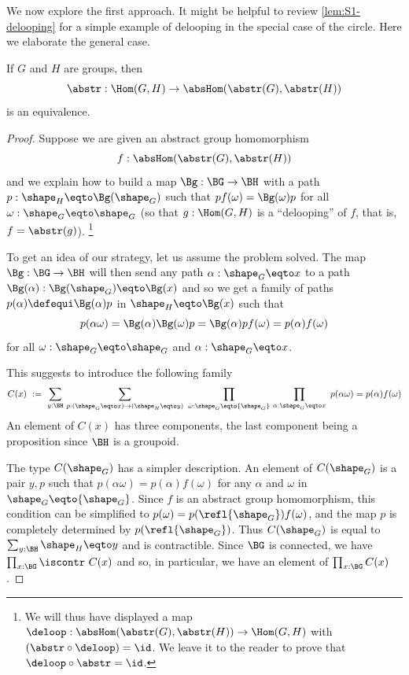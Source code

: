 \label{sec:delooping} %
We now explore the first approach.
It might be helpful to review \cref{lem:S1-delooping}
for a simple example of delooping in the special case of the circle.
Here we elaborate the general case.

\begin{lemma}
  \label{lem:homomabstrconcr}
  If $G$ and $H$ are groups, then
$$\abstr:\Hom(G,H)\to\absHom(\abstr(G),\abstr(H))$$
is an equivalence.
\end{lemma}

\begin{proof}
  Suppose we are given an abstract group homomorphism
$$f:\absHom(\abstr(G),\abstr(H))$$
and we explain how to build a map $\Bg:\BG \rightarrow \BH$ with
a path $p:\sh_H \eqto \Bg(\sh_G)$ such that $p f(\omega) = \Bg(\omega) p$
for all $\omega:\sh_G \eqto \sh_G$ (so that $g:\Hom(G,H)$ is a ``delooping'' of $f$, 
that is, $f=\abstr(g)$).%
\footnote{We will thus have displayed a map
$\deloop:\absHom(\abstr(G),\abstr(H))\to\Hom(G,H)$ with 
$({\abstr}\circ\deloop)=\id$. We leave it to the reader 
to prove that $\deloop\circ{\abstr}=\id$. }

To get an idea of our strategy, let us assume the problem solved. The map $\Bg:\BG\rightarrow \BH$
will then send any path $\alpha:\sh_G \eqto x$ to a path $\Bg(\alpha):\Bg(\sh_G) \eqto \Bg(x)$
and so we get a family of paths $p(\alpha) \defequi \Bg(\alpha) p$ in ${\sh_H} \eqto \Bg(x)$ such that
$$p(\alpha\omega) = \Bg(\alpha)\Bg(\omega)p
  = \Bg(\alpha)pf(\omega) = p(\alpha)f(\omega)$$
for all $\omega:\sh_G \eqto \sh_G$ and $\alpha : \sh_G \eqto x$.

This suggests to introduce the following family
$$
C(x)~:=~ \sum_{y:\BH}\,\sum_{p:(\sh_G \eqto x)\rightarrow (\sh_H \eqto y)}~\prod_{\omega:\sh_G \eqto {\sh_G}}\,\prod_{\alpha:\sh_G \eqto x}~
 p(\alpha\omega) = p(\alpha)f(\omega)
$$
 An element of $C(x)$ has three components, the last component being
 a proposition since $\BH$ is a groupoid.

 The type $C({\sh_G})$ has a simpler description. An element of $C({\sh_G})$ is
 a pair $y,p$ such that $p(\alpha\omega) = p(\alpha)f(\omega)$ for
 any $\alpha$ and $\omega$ in $\sh_G \eqto {\sh_G}$.
 Since $f$ is an abstract group homomorphism, this condition
 can be simplified to $p(\omega) = p(\refl{\sh_G})f(\omega)$, and the map $p$
 is completely determined by $p(\refl{\sh_G})$.
 Thus $C({\sh_G})$ is equal to $\sum_{y:\BH}\sh_H \eqto y$ and is contractible.
 Since $\BG$ is connected, we have
 $\prod_{x:\BG}\iscontr~ C(x)$
 and so, in particular, we have an element of $\prod_{x:\BG}C(x)$.


\end{proof}
